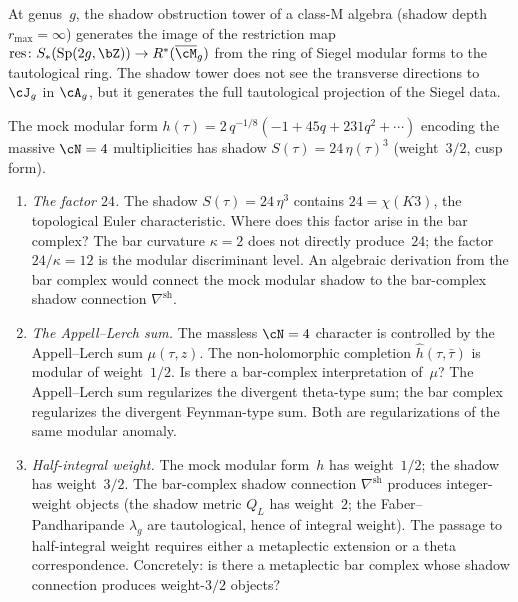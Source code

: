 \begin{conjecture}
\label{conj:shadow-taut-projection}
\ClaimStatusConjectured\quad
At genus~$g$, the shadow obstruction tower of a class-M
algebra \textup{(}shadow depth $r_{\max} = \infty$\textup{)}
generates the image of the restriction map
$\operatorname{res} \colon S_*(\operatorname{Sp}(2g,\bZ))
\to R^*(\overline{\cM}_g)$
from the ring of Siegel modular forms to the tautological
ring. The shadow tower does not see the transverse
directions to $\cJ_g$ in $\cA_g$, but it generates the
full tautological projection of the Siegel data.
\end{conjecture}



\begin{openproblem}
\label{op:programme-e-mock-modularity}
The mock modular form $h(\tau) =
2\,q^{-1/8}(-1 + 45q + 231q^2 + \cdots)$ encoding the
massive $\cN = 4$ multiplicities has shadow
$S(\tau) = 24\,\eta(\tau)^3$ (weight~$3/2$, cusp form).
\begin{enumerate}[label=\textup{(E\arabic*)}]
\item \emph{The factor $24$.} The shadow
 $S(\tau) = 24\,\eta^3$ contains
 $24 = \chi(K3)$, the topological Euler characteristic.
 Where does this factor arise in the bar complex?
 The bar curvature $\kappa = 2$ does not directly
 produce~$24$; the factor $24/\kappa = 12$ is the
 modular discriminant level. An algebraic derivation
 from the bar complex would connect the mock modular
 shadow to the bar-complex shadow connection
 $\nabla^{\mathrm{sh}}$.
\item \emph{The Appell--Lerch sum.} The massless $\cN = 4$
 character is controlled by the Appell--Lerch sum
 $\mu(\tau,z)$. The non-holomorphic completion
 $\hat{h}(\tau,\bar\tau)$ is modular of weight~$1/2$.
 Is there a bar-complex interpretation of~$\mu$?
 The Appell--Lerch sum regularizes the divergent
 theta-type sum; the bar complex regularizes the
 divergent Feynman-type sum.
 Both are regularizations of the same modular anomaly.
\item \emph{Half-integral weight.} The mock modular
 form~$h$ has weight~$1/2$; the shadow has weight~$3/2$.
 The bar-complex shadow connection $\nabla^{\mathrm{sh}}$
 produces integer-weight objects (the shadow metric $Q_L$
 has weight~$2$; the Faber--Pandharipande
 $\lambda_g$ are tautological, hence of integral weight).
 The passage to half-integral weight requires either
 a metaplectic extension or a theta correspondence.
 Concretely: is there a metaplectic bar complex whose
 shadow connection produces weight-$3/2$ objects?
\end{enumerate}
\end{openproblem}

